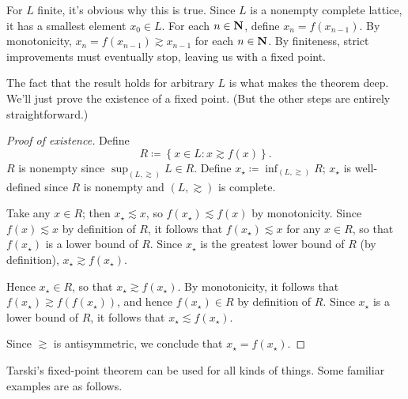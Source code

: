 \documentclass[11pt,letterpaper,reqno,oneside]{article}
\begin{document}
For $L$ finite, it's obvious why this is true. Since $L$ is a nonempty complete lattice, it has a smallest element $x_0 \in L$. For each $n \in \mathbf{N}$, define $x_n = f(x_{n-1})$. By monotonicity, $x_n = f(x_{n-1}) \gtrsim x_{n-1}$ for each $n \in \mathbf{N}$. By finiteness, strict improvements must eventually stop, leaving us with a fixed point.

The fact that the result holds for arbitrary $L$ is what makes the theorem deep. We'll just prove the existence of a fixed point. (But the other steps are entirely straightforward.)
%
\begin{proof}[Proof of existence]
	Define
	\begin{equation*}
		R \coloneqq \left\{ x \in L : x \gtrsim f(x) \right\} .
	\end{equation*}
	$R$ is nonempty since $\sup_{(L,\gtrsim)} L \in R$. Define $x_\star \coloneqq \inf_{(L,\gtrsim)} R$; $x_\star$ is well-defined since $R$ is nonempty and $(L,\gtrsim)$ is complete.

	Take any $x \in R$; then $x_\star \lesssim x$, so $f(x_\star) \lesssim f(x)$ by monotonicity. Since $f(x) \lesssim x$ by definition of $R$, it follows that $f(x_\star) \lesssim x$ for any $x \in R$, so that $f(x_\star)$ is a lower bound of $R$. Since $x_\star$ is the greatest lower bound of $R$ (by definition), $x_\star \gtrsim f(x_\star)$.

	Hence $x_\star \in R$, so that $x_\star \gtrsim f(x_\star)$. By monotonicity, it follows that $f(x_\star) \gtrsim f(f(x_\star))$, and hence $f(x_\star) \in R$ by definition of $R$. Since $x_\star$ is a lower bound of $R$, it follows that $x_\star \lesssim f(x_\star)$.

	Since $\gtrsim$ is antisymmetric, we conclude that $x_\star = f(x_\star)$.
\end{proof}


Tarski's fixed-point theorem can be used for all kinds of things. Some familiar examples are as follows.
\end{document}
